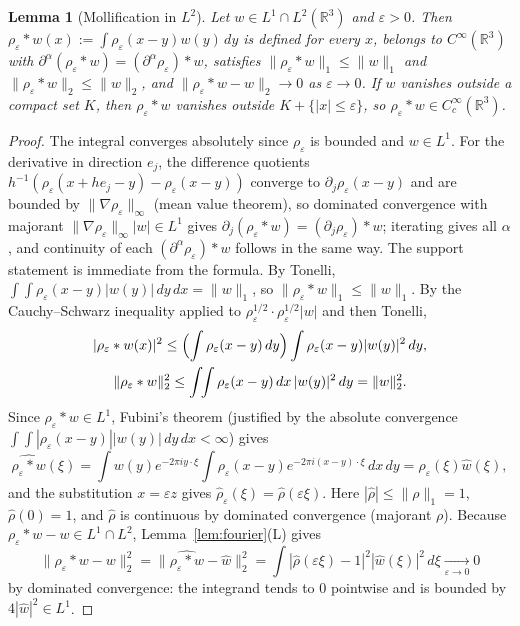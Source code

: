 \documentclass[11pt]{article}
\newtheorem{lemma}[theorem]{Lemma}
\theoremstyle{definition}
\theoremstyle{plain}
\newcommand{\R}{\mathbb R}
\begin{document}
\begin{lemma}[Mollification in $L^2$]\label{lem:mollify}
Let $w\in L^1\cap L^2(\R^3)$ and $\varepsilon>0$.  Then
$\rho_\varepsilon*w(x):=\int\rho_\varepsilon(x-y)w(y)\,dy$ is defined for
every $x$, belongs to $C^\infty(\R^3)$ with
$\partial^\alpha(\rho_\varepsilon*w)=(\partial^\alpha\rho_\varepsilon)*w$,
satisfies $\|\rho_\varepsilon*w\|_1\le\|w\|_1$ and
$\|\rho_\varepsilon*w\|_2\le\|w\|_2$, and
$\|\rho_\varepsilon*w-w\|_2\to0$ as $\varepsilon\to0$.  If $w$ vanishes
outside a compact set $K$, then $\rho_\varepsilon*w$ vanishes outside
$K+\{|x|\le\varepsilon\}$, so $\rho_\varepsilon*w\in C_c^\infty(\R^3)$.
\end{lemma}

\begin{proof}
The integral converges absolutely since $\rho_\varepsilon$ is bounded and
$w\in L^1$.  For the derivative in direction $e_j$, the difference quotients
$h^{-1}(\rho_\varepsilon(x+he_j-y)-\rho_\varepsilon(x-y))$ converge to
$\partial_j\rho_\varepsilon(x-y)$ and are bounded by
$\|\nabla\rho_\varepsilon\|_\infty$ (mean value theorem), so dominated
convergence with majorant $\|\nabla\rho_\varepsilon\|_\infty|w|\in L^1$
gives $\partial_j(\rho_\varepsilon*w)=(\partial_j\rho_\varepsilon)*w$;
iterating gives all $\alpha$, and continuity of each
$(\partial^\alpha\rho_\varepsilon)*w$ follows in the same way.  The support
statement is immediate from the formula.  By Tonelli,
$\int\!\!\int\rho_\varepsilon(x-y)|w(y)|\,dy\,dx=\|w\|_1$, so
$\|\rho_\varepsilon*w\|_1\le\|w\|_1$.  By the Cauchy--Schwarz inequality
applied to $\rho_\varepsilon^{1/2}\cdot\rho_\varepsilon^{1/2}|w|$ and then
Tonelli,
\[
\begin{gathered}
 |\rho_\varepsilon*w(x)|^2\le\Bigl(\int\rho_\varepsilon(x-y)\,dy\Bigr)
 \int\rho_\varepsilon(x-y)|w(y)|^2\,dy,\\
 \|\rho_\varepsilon*w\|_2^2\le\int\!\!\int\rho_\varepsilon(x-y)\,dx\,|w(y)|^2\,dy
 =\|w\|_2^2 .
\end{gathered}
\]
Since $\rho_\varepsilon*w\in L^1$, Fubini's theorem (justified by the
absolute convergence $\int\!\!\int|\rho_\varepsilon(x-y)||w(y)|\,dy\,dx<\infty$)
gives
\[
 \widehat{\rho_\varepsilon*w}(\xi)
 =\int w(y)e^{-2\pi iy\cdot\xi}\int\rho_\varepsilon(x-y)e^{-2\pi i(x-y)\cdot\xi}\,dx\,dy
 =\hat\rho_\varepsilon(\xi)\hat w(\xi),
\]
and the substitution $x=\varepsilon z$ gives
$\hat\rho_\varepsilon(\xi)=\hat\rho(\varepsilon\xi)$.  Here $|\hat\rho|\le\|\rho\|_1=1$,
$\hat\rho(0)=1$, and $\hat\rho$ is continuous by dominated convergence
(majorant $\rho$).  Because $\rho_\varepsilon*w-w\in L^1\cap L^2$,
Lemma~\ref{lem:fourier}(L) gives
\[
 \|\rho_\varepsilon*w-w\|_2^2=\|\widehat{\rho_\varepsilon*w}-\hat w\|_2^2
 =\int|\hat\rho(\varepsilon\xi)-1|^2|\hat w(\xi)|^2\,d\xi\xrightarrow[\varepsilon\to0]{}0
\]
by dominated convergence: the integrand tends to $0$ pointwise and is
bounded by $4|\hat w|^2\in L^1$.
\end{proof}
\end{document}
